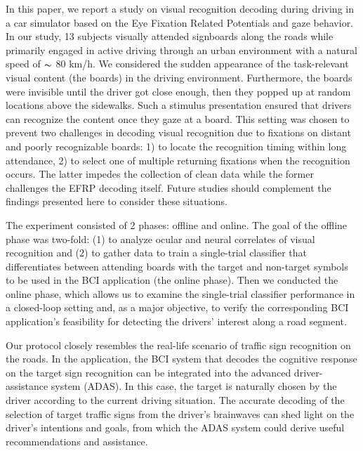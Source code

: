 \documentclass[12pt]{iopart}
\begin{document}
In this paper, we report a study on visual recognition decoding during driving
in a car simulator based on the Eye Fixation Related
Potentials and gaze behavior. 
In our study, 13 subjects visually attended signboards along the roads
while primarily engaged in active driving through
an urban environment with a natural speed of $\thicksim$ 80 km/h. 
We considered the sudden appearance of the task-relevant visual content (the boards) in the driving environment.
Furthermore, the boards were invisible until the driver got close enough,
then they popped up at random locations above the sidewalks.
Such a stimulus presentation ensured 
that drivers can recognize the content once they gaze at a board.
This setting was chosen to prevent
two challenges in decoding
visual recognition due to fixations on distant
and poorly recognizable boards:
1) to locate the recognition timing within long attendance,
2) to select one of multiple returning fixations when the recognition occurs.
The latter impedes the collection of clean data while the former challenges
the EFRP decoding itself.
Future studies should complement the findings presented here to consider these situations.

The experiment consisted of 2 phases: offline and online.
The goal of the offline phase was two-fold: (1) to analyze ocular
and neural correlates of visual recognition and (2) to gather data to train a single-trial classifier that differentiates between attending boards with the target and non-target symbols to be used in the BCI application (the online phase).
Then we conducted the online phase, which allows us to examine the single-trial classifier performance in a closed-loop setting and, as a major objective, to verify the corresponding BCI application's feasibility for detecting the drivers' interest along a road segment.

Our protocol closely resembles the real-life scenario of traffic sign
recognition on the roads. In the application, 
the BCI system that decodes the cognitive response on the target sign
recognition can be integrated into the advanced driver-assistance system
(ADAS).
In this case, the target is naturally chosen by the driver
according to the current driving situation. 
The accurate decoding of the selection of target traffic signs 
from the driver’s brainwaves can shed light on the driver’s intentions
and goals, from which the ADAS system could derive useful 
recommendations and assistance.
\end{document}
